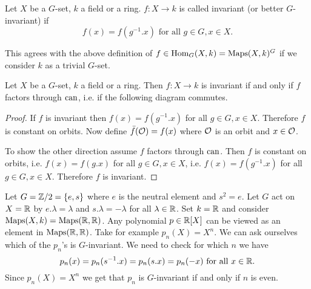 \begin{defi}
 Let $X$ be a $G$-set, $k$ a field or a ring. $f : X \to k$ is called invariant (or better $G$-invariant) if
 \[
  f(x) = f(g^{-1}.x) \text{ for all } g \in G, x \in X.
 \]
\end{defi}


\begin{note}
 This agrees with the above definition of $f \in \operatorname{Hom}_G(X,k) = \operatorname{Maps}(X,k)^G$ if we consider $k$ as a trivial $G$-set.
\end{note}


\begin{lem}
 Let $X$ be a $G$-set, $k$ a field or a ring. Then $f : X \to k$ is invariant if and only if $f$ factors through $\operatorname{can}$, i.e. if the following diagram commutes.
 \begin{center}
 \end{center}
\end{lem}
\begin{proof}
 If $f$ is invariant then $f(x) = f(g^{-1}.x)$ for all $g \in G, x \in X$. Therefore $f$ is constant on orbits. Now define $\bar{f}(\mathcal{O}) = f(x)$ where $\mathcal{O}$ is an orbit and $x \in \mathcal{O}$.
 
 To show the other direction assume $f$ factors through $\operatorname{can}$. Then $f$ is constant on orbits, i.e. $f(x) = f(g.x)$ for all $g \in G, x \in X$, i.e. $f(x) = f(g^{-1}.x)$ for all $g \in G, x \in X$. Therefore $f$ is invariant.
\end{proof}


\begin{expl}
 Let $G = \mathbb{Z}/2 = \{e,s\}$ where $e$ is the neutral element and $s^2 = e$. Let $G$ act on $X = \mathbb{R}$ by $e.\lambda = \lambda$ and $s.\lambda = -\lambda$ for all $\lambda \in \mathbb{R}$. Set $k = \mathbb{R}$ and consider $\operatorname{Maps}(X,k) = \operatorname{Maps}(\mathbb{R},\mathbb{R})$. Any polynomial $p \in \mathbb{R}[X]$ can be viewed as an element in $\operatorname{Maps}(\mathbb{R},\mathbb{R})$. Take for example $p_n(X) = X^n$. We can ask ourselves which of the $p_n$’s is $G$-invariant. We need to check for which $n$ we have
 \[
  p_n(x) = p_n(s^{-1}.x) = p_n(s.x) = p_n(-x) \text{ for all } x \in \mathbb{R}.
 \]
 Since $p_n(X) = X^n$ we get that $p_n$ is $G$-invariant if and only if $n$ is even.
\end{expl}


